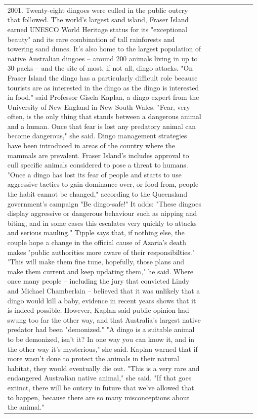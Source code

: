 \begin{table}[H]
\begin{tabular}{llrlllll}
2001. Twenty-eight dingoes were culled in the public outcry that followed. The world's largest sand island, Fraser Island earned UNESCO World Heritage status for its "exceptional beauty" and its rare combination of tall rainforests and towering sand dunes. It's also home to the largest population of native Australian dingoes -- around 200 animals living in up to 30 packs -- and the site of most, if not all, dingo attacks. "On Fraser Island the dingo has a particularly difficult role because tourists are as interested in the dingo as the dingo is interested in food," said Professor Gisela Kaplan, a dingo expert from the University of New England in New South Wales. "Fear, very often, is the only thing that stands between a dangerous animal and a human. Once that fear is lost any predatory animal can become dangerous," she said. Dingo management strategies have been introduced in areas of the country where the mammals are prevalent. Fraser Island's includes approval to cull specific animals considered to pose a threat to humans. "Once a dingo has lost its fear of people and starts to use aggressive tactics to gain dominance over, or food from, people the habit cannot be changed," according to the Queensland government's campaign "Be dingo-safe!" It adds: "These dingoes display aggressive or dangerous behaviour such as nipping and biting, and in some cases this escalates very quickly to attacks and serious mauling." Tipple says that, if nothing else, the couple hope a change in the official cause of Azaria's death makes "public authorities more aware of their responsibilties." "This will make them fine tune, hopefully, those plans and make them current and keep updating them," he said. Where once many people -- including the jury that convicted Lindy and Michael Chamberlain -- believed that it was unlikely that a dingo would kill a baby, evidence in recent years shows that it is indeed possible. However, Kaplan said public opinion had swung too far the other way, and that Australia's largest native predator had been "demonized." "A dingo is a suitable animal to be demonized, isn't it? In one way you can know it, and in the other way it's mysterious," she said. Kaplan warned that if more wasn't done to protect the animals in their natural habitat, they would eventually die out. "This is a very rare and endangered Australian native animal," she said. "If that goes extinct, there will be outcry in future that we've allowed that to happen, because there are so many misconceptions about the animal."


\end{tabular}
\end{table}
